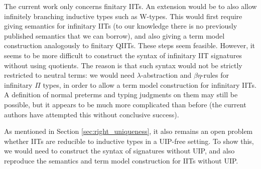 \documentclass[a4paper,UKenglish,cleveref, autoref]{lipics-v2019}
\begin{document}
The current work only concerns finitary IITs. An extension would be to also
allow infinitely branching inductive types such as W-types. This would first
require giving semantics for infinitary IITs (to our knowledge there is no
previously published semantics that we can borrow), and also giving a term model
construction analogously to finitary QIITs. These steps seem feasible. However,
it seems to be more difficult to construct the syntax of infinitary IIT
signatures without using quotients. The reason is that such syntax would not be
strictly restricted to neutral terms: we would need $\lambda$-abstraction and
$\beta\eta$-rules for infinitary $\Pi$ types, in order to allow a term model
construction for infinitary IITs. A definition of normal preterms and typing
judgments on them may still be possible, but it appears to be much more
complicated than before (the current authors have attempted this without
conclusive success).

As mentioned in Section \ref{sec:right_uniqueness}, it also remains an open
problem whether IITs are reducible to inductive types in a UIP-free setting. To
show this, we would need to construct the syntax of signatures without UIP, and
also reproduce the semantics and term model construction for IITs without UIP.


\end{document}
